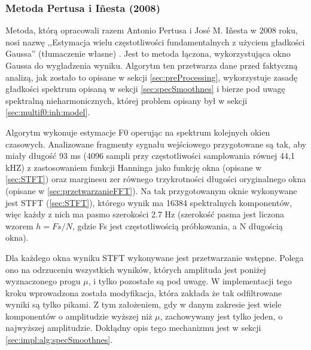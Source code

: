 \documentclass[12pt,a4paper,twoside]{mwart}
\begin{document}
\subsubsection{Metoda Pertusa i Iñesta (2008)}
Metoda, którą opracowali razem Antonio Pertusa i José M. Iñesta w 2008 roku, nosi nazwę ,,Estymacja wielu częstotliwości fundamentalnych z użyciem gładkości Gaussa'' (tłumaczenie własne) \cite{Transcription:Pertus:Inharmonicity}. Jest to metoda łączona, wykorzystująca okno Gaussa do wygładzenia wyniku. Algorytm ten przetwarza dane przed faktyczną analizą, jak zostało to opisane w sekcji \ref{sec:preProcessing}, wykorzystuje zasadę gładkości spektrum opisaną w sekcji \ref{sec:specSmoothnes} i bierze pod uwagę spektralną nieharmonicznych, której problem opisany był w sekcji \ref{sec:multif0:inh:model}.

Algorytm wykonuje estymacje F0 operując na spektrum kolejnych okien czasowych. Analizowane fragmenty sygnału wejściowego przygotowane są tak, aby miały długość 93 ms (4096 sampli przy częstotliwości samplowania równej 44,1 kHZ) z zastosowaniem funkcji Hanninga jako funkcję okna (opisane w \ref{sec:STFT}) oraz marginesu zer równego trzykrotności długości oryginalnego okna (opisane w \ref{sec:przetwarzanieFFT}). Na tak przygotowanym oknie wykonywane jest STFT (\ref{sec:STFT}), którego wynik ma 16384 spektralnych komponentów, więc każdy z nich ma pasmo szerokości 2.7 Hz (szerokość pasma jest liczona wzorem $h = Fs / N$, gdzie Fs jest częstotliwością próbkowania, a N długością okna).

Dla każdego okna wyniku STFT wykonywane jest przetwarzanie wstępne. Polega ono na odrzuceniu wszystkich wyników, których amplituda jest poniżej wyznaczonego progu $\mu$, i tylko pozostałe są pod uwagę. W implementacji tego kroku wprowadzona została modyfikacja, która zakłada że tak odfiltrowane wyniki są tylko pikami. Z tym założeniem, gdy w danym zakresie jest wiele komponentów o amplitudzie wyższej niż $\mu$, zachowywany jest tylko jeden, o najwyższej amplitudzie. Dokłądny opis tego mechanizmu jest w sekcji \ref{sec:impl:alg:specSmoothnes}.
\end{document}
